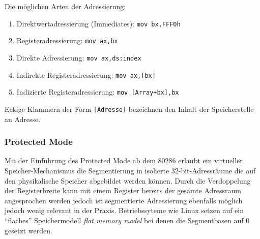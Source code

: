 Die möglichen Arten der Adressierung:

\begin{enumerate}
\item Direktwertadressierung (Immediates): {\tt mov bx,FFF0h}
\item Registeradressierung: {\tt mov 	ax,bx}
\item Direkte Adressierung: {\tt mov 	ax,ds:index}
\item Indirekte Registeradressierung: {\tt mov ax,[bx]}
\item Indizierte Registeradressierung: {\tt mov [Array+bx],bx}
\end{enumerate}
Eckige Klammern der Form {\tt [Adresse]} bezeichnen den Inhalt der Speicherstelle an Adresse.

\subsubsection{Protected Mode}

Mit der Einführung des Protected Mode ab dem 80286 erlaubt ein virtueller Speicher-Mechanismus die Segmentierung in isolierte 32-bit-Adressräume die auf den physikalische Speicher abgebildet werden können. Durch die Verdoppelung der Registerbreite kann mit einem Register bereits der gesamte Adressraum angesprochen werden jedoch ist segmentierte Adressierung ebenfalls möglich jedoch wenig relevant  in der Praxis. Betriebssyteme wie Linux setzen auf ein ``flaches'' Speichermodell \emph{flat memory model} bei denen die Segmentbasen auf 0 gesetzt werden.

